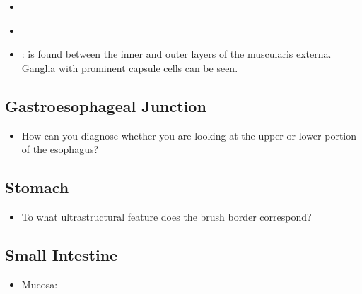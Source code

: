 \begin{itemize}
\begin{multicols}{2}
\begin{itemize}
    \item {}
    
    \begin{center}
    \end{center}

    \item {}
    
    \begin{center}
    \end{center}
    
    \item {}:  is found between the inner and outer layers of the muscularis externa. Ganglia with prominent capsule cells can be seen.
    
    \begin{center}
    \end{center}
    
  \end{itemize}
  \end{multicols}
  
  \subsection{Gastroesophageal Junction}\label{Gastroesophageal Junction}
  \begin{multicols}{2}
  \begin{itemize}
    \item How can you diagnose whether you are  
    looking at the upper or lower portion of the esophagus?
  \end{itemize}
  \end{multicols}

  \subsection{Stomach}\label{Stomach}
  \begin{multicols}{2}
  \begin{itemize}
    \item To what ultrastructural feature does the brush border correspond?
  \end{itemize}
  \end{multicols}

  \subsection{Small Intestine}\label{Small Intestine}
  \begin{multicols}{2}
  \begin{itemize}
    \item Mucosa: 
  \end{itemize}
  \end{multicols}
  

\end{itemize}
